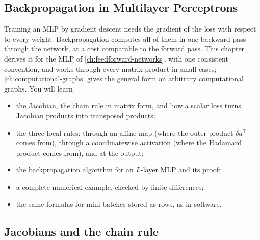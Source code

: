 \begin{notechapter}
\chapter{Backpropagation in Multilayer Perceptrons}\label{ch:backpropagation}

\begin{chapterintro}
Training an MLP by gradient descent needs the gradient of the loss with respect to every
weight. Backpropagation computes all of them in one backward pass through the network, at
a cost comparable to the forward pass. This chapter derives it for the MLP of
\cref{ch:feedforward-networks}, with one consistent convention, and works through every
matrix product in small cases; \cref{ch:computational-graphs} gives the general form on
arbitrary computational graphs. You will learn
\begin{itemize}[nosep]
  \item the Jacobian, the chain rule in matrix form, and how a scalar loss turns Jacobian
        products into transposed products;
  \item the three local rules: through an affine map (where the outer product
        $\delta a^\top$ comes from), through a coordinatewise activation (where the Hadamard product
        comes from), and at the output;
  \item the backpropagation algorithm for an $L$-layer MLP and its proof;
  \item a complete numerical example, checked by finite differences;
  \item the same formulas for mini-batches stored as rows, as in software.
\end{itemize}
\end{chapterintro}

\section{Jacobians and the chain rule}\label{backpropagation:sec:chain}


\end{notechapter}
